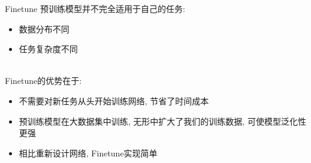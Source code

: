 \begin{frame}{Finetune}
    预训练模型并不完全适用于自己的任务:
    \begin{itemize}
        \item 数据分布不同
        \item 任务复杂度不同
    \end{itemize}

    \hspace{1cm}\\[0.5cm]
    Finetune的优势在于:
    \begin{itemize}
        \item 不需要对新任务从头开始训练网络, 节省了时间成本
        \item 预训练模型在大数据集中训练, 无形中扩大了我们的训练数据, 可使模型泛化性更强
        \item 相比重新设计网络, Finetune实现简单
    \end{itemize}
\end{frame}

